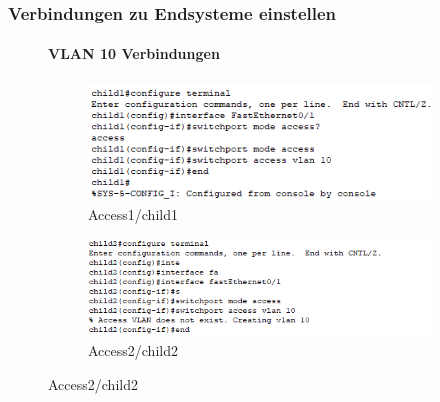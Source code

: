 \subsubsection{Verbindungen zu Endsysteme einstellen}
\begin{figure}[!htb]
    \paragraph{VLAN 10 Verbindungen}
    \centering
    \begin{subfigure}{\textwidth}
        \includegraphics[width=\textwidth]{./img/Access1/users.png}
        \caption{Access1/child1}
    \end{subfigure}
    \begin{subfigure}{\textwidth}
        \includegraphics[width=\textwidth]{./img/Access2/users.png}
        \caption{Access2/child2}
    \end{subfigure}
\end{figure}

